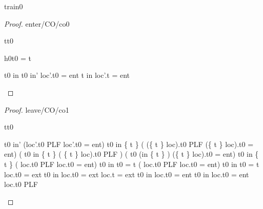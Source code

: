 \documentclass[12pt]{amsart}
\begin{document}
\begin{machine}{train0}
\begin{proof}{enter/CO/co0}
\begin{free:var}{t}{t0}
	\begin{by:cases}
	\begin{case}{h0}{t0 = t}
	\begin{calculation}
		\neg t0 \in in \land t0 \in in' \implies  loc'.t0 = ent 
	\hint{=}{ \eqref{h0} \ref{a1}  }
		\neg t \in in \implies  loc'.t = ent 
	\hint{=}{ \ref{a2} }
		\true
	\end{calculation}
	\end{case}
	\end{by:cases}
	\end{free:var}
\end{proof}

\begin{proof}{leave/CO/co1}
	\begin{free:var}{t}{t0}
	\begin{calculation}
		t0 \in in' \land (loc'.t0 \in PLF \lor loc'.t0 = ent)
		t0 \in in \setminus \{ t \} 
		\land ( (\{ t \} \domsub loc).t0 \in PLF \lor (\{ t \} \domsub loc).t0 = ent)
	\hint{=}{ }	%
		( t0 \in in \setminus \{ t \} 
		\land  ( \{ t \} \domsub loc).t0 \in PLF )
			   \lor ( t0 \in (in \setminus \{ t \} )
		\land (\{ t \} \domsub loc).t0 = ent)
	\hint{=}{ \ref{inv2} }	%
			t0 \in in \setminus \{ t \} 
		\land ( loc.t0 \in PLF \lor  loc.t0 = ent)
	\hint{=}{ } %
		t0 \in in \land \neg t0  = t 
		\land ( loc.t0 \in PLF \lor  loc.t0 = ent)
	\hint{=}{  } %
		t0 \in in \land \neg t0  = t \land \neg loc.t0 = ext
	\hint{=}{  \ref{grd0} } %
	 	t0 \in in \land \neg loc.t0 = ext \land loc.t = ext
	\hint{\follows}{  \ref{grd0} } %
	 	t0 \in in \land loc.t0 = ent 
	\hint{=}{   } %
	 	t0 \in in \land loc.t0 = ent  \land \neg loc.t0 \in PLF 
	\end{calculation}
	\end{free:var}
\end{proof}


\end{machine}
\end{document}
